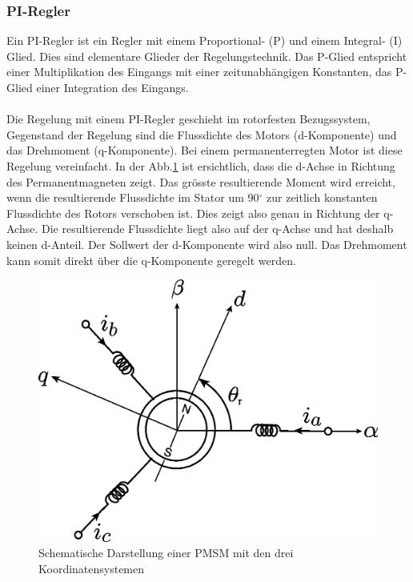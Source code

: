 \subsubsection*{PI-Regler}
Ein PI-Regler ist ein Regler mit einem Proportional- (P) und einem Integral- (I) Glied. Dies sind elementare Glieder der Regelungstechnik. Das P-Glied entspricht einer Multiplikation des Eingangs mit einer zeitunabhängigen Konstanten, das P-Glied einer Integration des Eingangs. 
\\\\
Die Regelung mit einem PI-Regler geschieht im rotorfesten Bezugssystem, Gegenstand der Regelung sind die Flussdichte des Motors (d-Komponente) und das Drehmoment (q-Komponente). Bei einem permanenterregten Motor ist diese Regelung vereinfacht. In der Abb.\ref{fig:trafoschematicpmsm} ist ersichtlich, dass die d-Achse in Richtung des Permanentmagneten zeigt. Das grösste resultierende Moment wird erreicht, wenn die resultierende Flussdichte im Stator um 90\(^\circ\) zur zeitlich konstanten Flussdichte des Rotors verschoben ist. Dies zeigt also genau in Richtung der q-Achse. Die resultierende Flussdichte liegt also auf der q-Achse und hat deshalb keinen d-Anteil. Der Sollwert der d-Komponente wird also null. Das Drehmoment kann somit direkt über die q-Komponente geregelt werden. 
\begin{figure}
	\centering
	\includegraphics[width=1\linewidth]{images/trafo_schematicPMSM}
	\caption{Schematische Darstellung einer PMSM mit den drei Koordinatensystemen }
	\label{fig:trafoschematicpmsm}
\end{figure}

